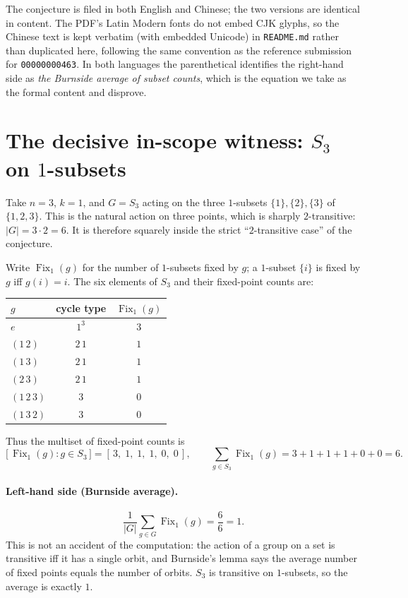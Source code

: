 \documentclass[11pt]{article}
\theoremstyle{definition}
\theoremstyle{remark}
\newcommand{\Sthree}{S_3}
\newcommand{\Fix}{\operatorname{Fix}}
\begin{document}
The conjecture is filed in both English and Chinese; the two versions are
identical in content. The PDF's Latin Modern fonts do not embed CJK glyphs, so
the Chinese text is kept verbatim (with embedded Unicode) in
\texttt{README.md} rather than duplicated here, following the same convention
as the reference submission for \texttt{00000000463}. In both languages the
parenthetical identifies the
right-hand side as \emph{the Burnside average of subset counts}, which is the
equation we take as the formal content and disprove.

\section{The decisive in-scope witness: $\Sthree$ on $1$-subsets}
\label{sec:witness}

Take $n=3$, $k=1$, and $G=\Sthree$ acting on the three $1$-subsets
$\{1\},\{2\},\{3\}$ of $\{1,2,3\}$. This is the natural action on three points,
which is sharply $2$-transitive: $|G| = 3\cdot 2 = 6$. It is therefore
squarely inside the strict ``$2$-transitive case'' of the conjecture.

Write $\Fix_1(g)$ for the number of $1$-subsets fixed by $g$; a $1$-subset
$\{i\}$ is fixed by $g$ iff $g(i)=i$. The six elements of $\Sthree$ and their
fixed-point counts are:

\begin{center}
\begin{tabular}{l c c}
\toprule
$g$ & cycle type & $\Fix_1(g)$ \\
\midrule
$e$            & $1^3$   & $3$ \\
$(1\,2)$       & $2\,1$  & $1$ \\
$(1\,3)$       & $2\,1$  & $1$ \\
$(2\,3)$       & $2\,1$  & $1$ \\
$(1\,2\,3)$    & $3$     & $0$ \\
$(1\,3\,2)$    & $3$     & $0$ \\
\bottomrule
\end{tabular}
\end{center}

Thus the multiset of fixed-point counts is
\[
\bigl[\,\Fix_1(g) : g \in \Sthree\,\bigr] = [\,3,\;1,\;1,\;1,\;0,\;0\,],
\qquad
\sum_{g \in \Sthree} \Fix_1(g) = 3 + 1 + 1 + 1 + 0 + 0 = 6 .
\]

\paragraph{Left-hand side (Burnside average).}
\[
\frac{1}{|G|}\sum_{g\in G}\Fix_1(g)
= \frac{6}{6} = 1 .
\]
This is not an accident of the computation: the action of a group on a set is
transitive iff it has a single orbit, and Burnside's lemma says the average
number of fixed points equals the number of orbits. $\Sthree$ is transitive on
$1$-subsets, so the average is exactly $1$.
\end{document}
